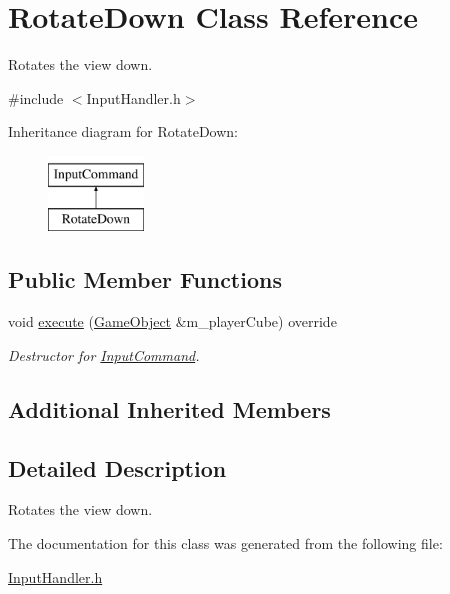 \hypertarget{class_rotate_down}{}\section{Rotate\+Down Class Reference}
\label{class_rotate_down}


Rotates the view down.  




{\ttfamily \#include $<$Input\+Handler.\+h$>$}

Inheritance diagram for Rotate\+Down\+:\begin{figure}[H]
\begin{center}
\leavevmode
\includegraphics[height=2.000000cm]{class_rotate_down}
\end{center}
\end{figure}
\subsection*{Public Member Functions}
\begin{DoxyCompactItemize}
\item 
\mbox{\label{class_rotate_down_acde62fdda086e69da418edc395e8824e}} 
void \mbox{\hyperlink{class_rotate_down_acde62fdda086e69da418edc395e8824e}{execute}} (\mbox{\hyperlink{class_game_object}{Game\+Object}} \&m\+\_\+player\+Cube) override
\begin{DoxyCompactList}\small\item\em Destructor for \mbox{\hyperlink{class_input_command}{Input\+Command}}. \end{DoxyCompactList}\end{DoxyCompactItemize}
\subsection*{Additional Inherited Members}


\subsection{Detailed Description}
Rotates the view down. 

The documentation for this class was generated from the following file\+:\begin{DoxyCompactItemize}
\item 
\mbox{\hyperlink{_input_handler_8h}{Input\+Handler.\+h}}\end{DoxyCompactItemize}
